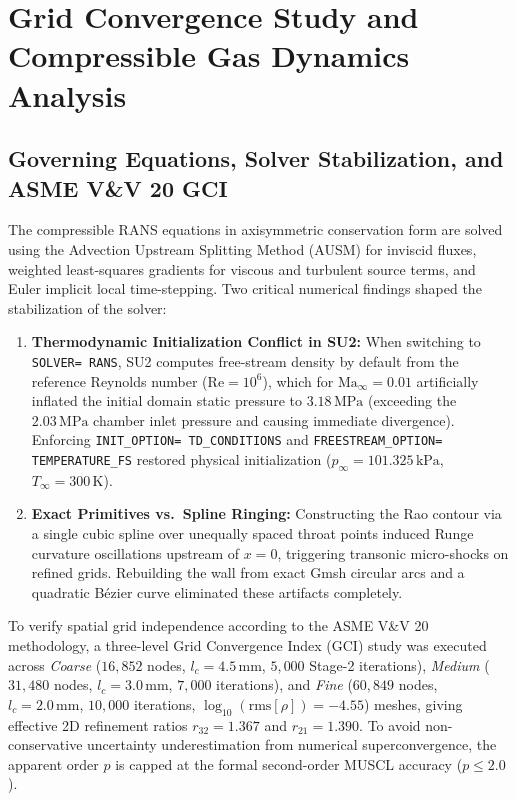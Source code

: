 \documentclass[11pt,a4paper]{article}
\begin{document}
\section{Grid Convergence Study and Compressible Gas Dynamics Analysis}

\subsection{Governing Equations, Solver Stabilization, and ASME V\&V 20 GCI}
The compressible RANS equations in axisymmetric conservation form are solved using the Advection Upstream Splitting Method (AUSM) for inviscid fluxes, weighted least-squares gradients for viscous and turbulent source terms, and Euler implicit local time-stepping. Two critical numerical findings shaped the stabilization of the solver:
\begin{enumerate}
    \item \textbf{Thermodynamic Initialization Conflict in SU2:} When switching to \texttt{SOLVER= RANS}, SU2 computes free-stream density by default from the reference Reynolds number ($\mathrm{Re} = 10^6$), which for $\mathrm{Ma}_\infty = 0.01$ artificially inflated the initial domain static pressure to $3.18\,\mathrm{MPa}$ (exceeding the $2.03\,\mathrm{MPa}$ chamber inlet pressure and causing immediate divergence). Enforcing \texttt{INIT\_OPTION= TD\_CONDITIONS} and \texttt{FREESTREAM\_OPTION= TEMPERATURE\_FS} restored physical initialization ($p_\infty = 101.325\,\mathrm{kPa}$, $T_\infty = 300\,\mathrm{K}$).
    \item \textbf{Exact Primitives vs.\ Spline Ringing:} Constructing the Rao contour via a single cubic spline over unequally spaced throat points induced Runge curvature oscillations upstream of $x = 0$, triggering transonic micro-shocks on refined grids. Rebuilding the wall from exact Gmsh circular arcs and a quadratic B\'ezier curve eliminated these artifacts completely.
\end{enumerate}

To verify spatial grid independence according to the ASME V\&V 20 methodology, a three-level Grid Convergence Index (GCI) study was executed across \textit{Coarse} ($16{,}852$ nodes, $l_c = 4.5\,\mathrm{mm}$, $5{,}000$ Stage-2 iterations), \textit{Medium} ($31{,}480$ nodes, $l_c = 3.0\,\mathrm{mm}$, $7{,}000$ iterations), and \textit{Fine} ($60{,}849$ nodes, $l_c = 2.0\,\mathrm{mm}$, $10{,}000$ iterations, $\log_{10}(\mathrm{rms}[\rho]) = -4.55$) meshes, giving effective 2D refinement ratios $r_{32} = 1.367$ and $r_{21} = 1.390$. To avoid non-conservative uncertainty underestimation from numerical superconvergence, the apparent order $p$ is capped at the formal second-order MUSCL accuracy ($p \le 2.0$).
\end{document}
